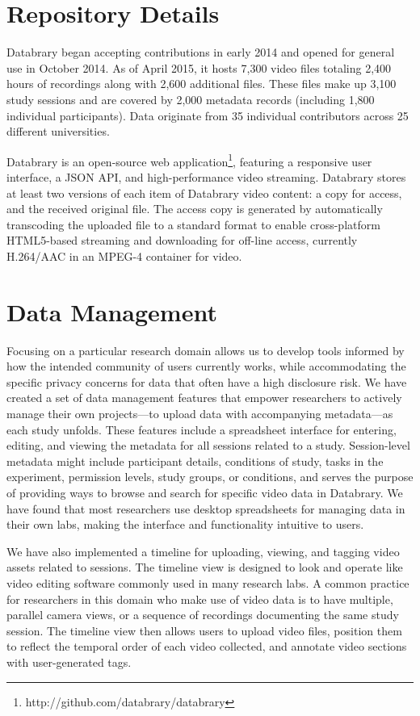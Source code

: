 \documentclass{sig-alternate-2013}
\begin{document}
\section{Repository Details}

Databrary began accepting contributions in early 2014 and opened for general use in October 2014.
As of April 2015, it hosts 7,300 video files totaling 2,400 hours of recordings along with 2,600 additional files.
These files make up 3,100 study sessions and are covered by 2,000 metadata records (including 1,800 individual participants).
Data originate from 35 individual contributors across 25 different universities.

Databrary is an open-source web application\footnote{http://github.com/databrary/databrary}, featuring a responsive user interface, a JSON API, and high-performance video streaming.
Databrary stores at least two versions of each item of Databrary video content: a copy for access, and the received original file.
The access copy is generated by automatically transcoding the uploaded file to a standard format to enable cross-platform HTML5-based streaming and downloading for off-line access, currently H.264/AAC in an MPEG-4 container for video.

\section{Data Management}

Focusing on a particular research domain allows us to develop tools informed by how the intended community of users currently works, while accommodating the specific privacy concerns for data that often have a high disclosure risk.
We have created a set of data management features that empower researchers to actively manage their own projects---to upload data with accompanying metadata---as each study unfolds. 
These features include a spreadsheet interface for entering, editing, and viewing the metadata for all sessions related to a study.
Session-level metadata might include participant details, conditions of study, tasks in the experiment, permission levels, study groups, or conditions, and serves the purpose of providing ways to browse and search for specific video data in Databrary. 
We have found that most researchers use desktop spreadsheets for managing data in their own labs, making the interface and functionality intuitive to users. 

We have also implemented a timeline for uploading, viewing, and tagging video assets related to sessions.
The timeline view is designed to look and operate like video editing software commonly used in many research labs.
A common practice for researchers in this domain who make use of video data is to have multiple, parallel camera views, or a sequence of recordings documenting the same study session.
The timeline view then allows users to upload video files, position them to reflect the temporal order of each video collected, and annotate video sections with user-generated tags. 
\end{document}
